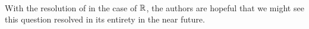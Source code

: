 \ 

With the resolution of  in the case of $\mathbb{R}$, the authors are hopeful that we might see this question resolved in its entirety in the near future.


	

